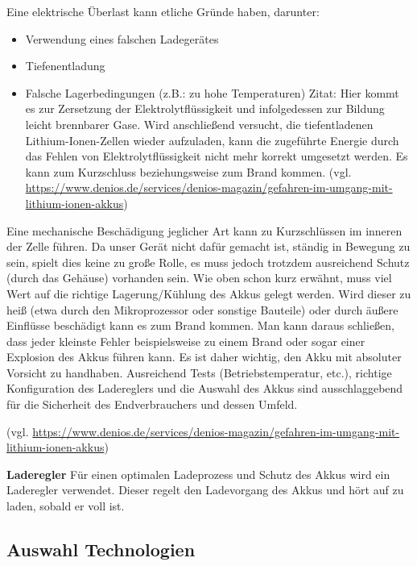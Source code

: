 \documentclass[]{article}
\begin{document}
Eine elektrische Überlast kann etliche Gründe haben, darunter: 
\begin{itemize}
	\item Verwendung eines falschen Ladegerätes
	\item Tiefenentladung
	\item Falsche Lagerbedingungen (z.B.: zu hohe Temperaturen) 
\newline
Zitat: \glqq Hier kommt es zur Zersetzung der Elektrolytflüssigkeit und infolgedessen zur Bildung leicht brennbarer Gase. Wird anschließend versucht, die tiefentladenen Lithium-Ionen-Zellen wieder aufzuladen, kann die zugeführte Energie durch das Fehlen von Elektrolytflüssigkeit nicht mehr korrekt umgesetzt werden. Es kann zum Kurzschluss beziehungsweise zum Brand kommen.\grqq{} (vgl. \url{https://www.denios.de/services/denios-magazin/gefahren-im-umgang-mit-lithium-ionen-akkus})
\end{itemize}
Eine mechanische Beschädigung jeglicher Art kann zu Kurzschlüssen im inneren der Zelle führen. Da unser Gerät nicht dafür gemacht ist, ständig in Bewegung zu sein, spielt dies keine zu große Rolle, es muss jedoch trotzdem ausreichend Schutz (durch das Gehäuse) vorhanden sein.
\vspace{4mm}\newline
Wie oben schon kurz erwähnt, muss viel Wert auf die richtige Lagerung/Kühlung des Akkus gelegt werden. Wird dieser zu heiß (etwa durch den Mikroprozessor oder sonstige Bauteile) oder durch äußere Einflüsse beschädigt kann es zum Brand kommen.
\vspace{4mm}\newline
Man kann daraus schließen, dass jeder kleinste Fehler beispielsweise zu einem Brand oder sogar einer Explosion des Akkus führen kann. Es ist daher wichtig, den Akku mit absoluter Vorsicht zu handhaben. Ausreichend Tests (Betriebstemperatur, etc.), richtige Konfiguration des Ladereglers und die Auswahl des Akkus sind ausschlaggebend für die Sicherheit des Endverbrauchers und dessen Umfeld.

(vgl. \url{https://www.denios.de/services/denios-magazin/gefahren-im-umgang-mit-lithium-ionen-akkus})

\textbf{Laderegler}\newline
Für einen optimalen Ladeprozess und Schutz des Akkus wird ein Laderegler verwendet. Dieser regelt den Ladevorgang des Akkus und hört auf zu laden, sobald er voll ist.


\subsection{Auswahl Technologien}
\end{document}
